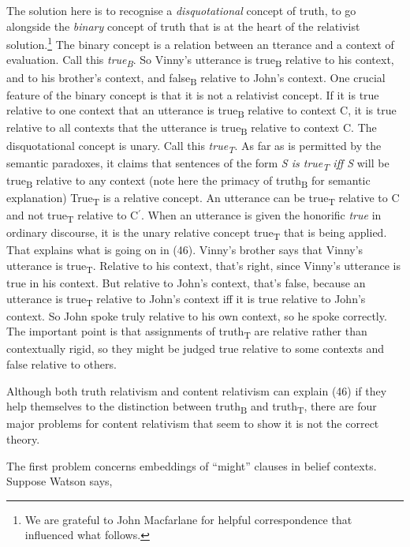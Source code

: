 \documentclass[
  11pt,
  letterpaper,
  DIV=11,
  numbers=noendperiod]{scrartcl}
\begin{document}
The solution here is to recognise a \emph{disquotational} concept of
truth, to go alongside the \emph{binary} concept of truth that is at the
heart of the relativist solution.\footnote{We are grateful to John
  Macfarlane for helpful correspondence that influenced what follows.}
The binary concept is a relation between an tterance and a context of
evaluation. Call this \emph{true\textsubscript{B}}. So Vinny's utterance
is true\textsubscript{B} relative to his context, and to his brother's
context, and false\textsubscript{B} relative to John's context. One
crucial feature of the binary concept is that it is not a relativist
concept. If it is true relative to one context that an utterance is
true\textsubscript{B} relative to context C, it is true relative to all
contexts that the utterance is true\textsubscript{B} relative to context
C. The disquotational concept is unary. Call this
\emph{true\textsubscript{T}}. As far as is permitted by the semantic
paradoxes, it claims that sentences of the form \emph{S is
true\textsubscript{T}} \emph{iff S} will be true\textsubscript{B}
relative to any context (note here the primacy of truth\textsubscript{B}
for semantic explanation) True\textsubscript{T} is a relative concept.
An utterance can be true\textsubscript{T} relative to C and not
true\textsubscript{T} relative to C\(^\prime\). When an utterance is
given the honorific \emph{true} in ordinary discourse, it is the unary
relative concept true\textsubscript{T} that is being applied. That
explains what is going on in (46). Vinny's brother says that Vinny's
utterance is true\textsubscript{T}. Relative to his context, that's
right, since Vinny's utterance is true in his context. But relative to
John's context, that's false, because an utterance is
true\textsubscript{T} relative to John's context iff it is true relative
to John's context. So John spoke truly relative to his own context, so
he spoke correctly. The important point is that assignments of
truth\textsubscript{T} are relative rather than contextually rigid, so
they might be judged true relative to some contexts and false relative
to others.

Although both truth relativism and content relativism can explain (46)
if they help themselves to the distinction between
truth\textsubscript{B} and truth\textsubscript{T}, there are four major
problems for content relativism that seem to show it is not the correct
theory.

The first problem concerns embeddings of ``might'' clauses in belief
contexts. Suppose Watson says,
\end{document}
